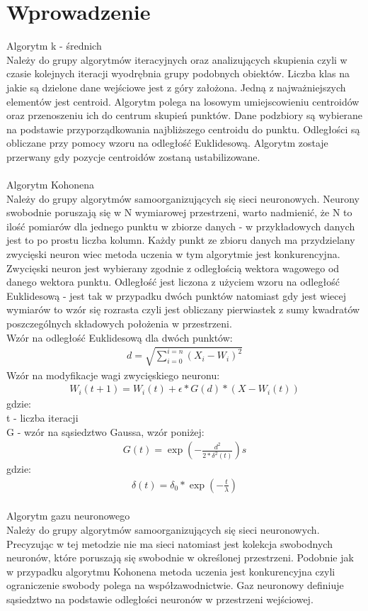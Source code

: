 \documentclass{classrep}
\begin{document}
\section{Wprowadzenie}
{Algorytm k - średnich \\
Należy do grupy algorytmów iteracyjnych oraz analizujących skupienia czyli w czasie kolejnych iteracji wyodrębnia grupy podobnych obiektów. Liczba klas na jakie są dzielone dane wejściowe jest z góry założona. Jedną z najważniejszych elementów jest centroid. Algorytm polega na losowym umiejscowieniu centroidów oraz przenoszeniu ich do centrum skupień punktów. Dane podzbiory są wybierane na podstawie przyporządkowania najbliższego centroidu do punktu. Odległości są obliczane przy pomocy wzoru na odległość Euklidesową. Algorytm zostaje przerwany gdy pozycje centroidów zostaną ustabilizowane.\\\\

Algorytm Kohonena\\
Należy do grupy algorytmów samoorganizujących się sieci neuronowych. Neurony swobodnie poruszają się w N wymiarowej przestrzeni, warto nadmienić, że N to ilość pomiarów dla jednego punktu w zbiorze danych - w przykładowych danych jest to po prostu liczba kolumn. Każdy punkt ze zbioru danych ma przydzielany zwycięski neuron wiec metoda uczenia w tym algorytmie jest konkurencyjna. Zwycięski neuron jest wybierany zgodnie z odległością wektora wagowego od danego wektora punktu. Odległość jest liczona z użyciem wzoru na odległość Euklidesową - jest tak w przypadku dwóch punktów natomiast gdy jest wiecej wymiarów to wzór się rozrasta czyli jest obliczany pierwiastek z sumy kwadratów poszczególnych składowych położenia w przestrzeni. \\

Wzór na odległość Euklidesową dla dwóch punktów: 
\begin{align*}
d=\displaystyle\sqrt{\sum_{i=0}^{i=n} {(X_i - W_i)^2}}
\end{align*}
Wzór na modyfikacje wagi zwycięskiego neuronu: 
\begin{align*}
W_i(t + 1) = W_i(t) + \epsilon * G(d)* (X - W_i(t))
\end{align*}
gdzie:\\
t - liczba iteracji\\
G - wzór na sąsiedztwo Gaussa, wzór poniżej:
\begin{align*}
G(t) = \exp (-\frac{d^2} {2* \delta^2(t)})s
\end{align*}
gdzie:
\begin{align*}
\delta(t) = \delta_0 * \exp (-\frac {t} { \lambda })
\end{align*}
\\
Algorytm gazu neuronowego\\
Należy do grupy algorytmów samoorganizujących się sieci neuronowych. Precyzując w tej metodzie nie ma sieci natomiast jest kolekcja swobodnych neuronów, które poruszają się swobodnie w określonej przestrzeni. Podobnie jak w przypadku algorytmu Kohonena metoda uczenia jest konkurencyjna czyli ograniczenie swobody polega na współzawodnictwie. Gaz neuronowy definiuje sąsiedztwo na podstawie odległości neuronów w przestrzeni wejściowej. \\

}
\end{document}
